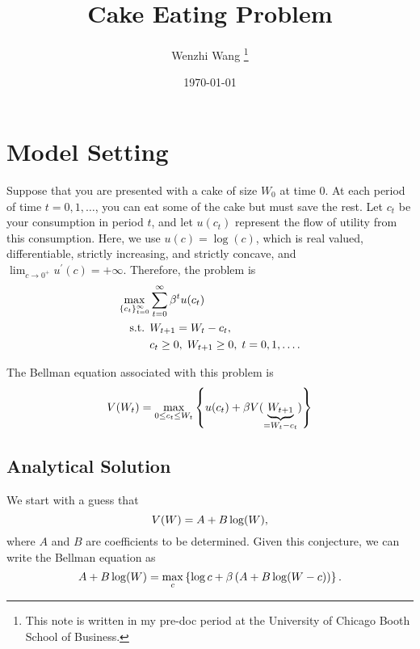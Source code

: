 \documentclass[12pt]{article}
\theoremstyle{definition}
\begin{document}

\title{\bf Cake Eating Problem}
\author{Wenzhi Wang \thanks{This note is written in my pre-doc period at the University of Chicago Booth School of Business.} } 
\date{\today}
\maketitle

\section{Model Setting}

Suppose that you are presented with a cake of size $W_0$ at time $0$. At each period of time $t = 0, 1, \ldots$, you can eat some of the cake but must save the rest. Let $c_t$ be your consumption in period $t$, and let $u(c_t)$ represent the flow of utility from this consumption. Here, we use $u(c) = \log(c)$, which is real valued, differentiable, strictly increasing, and strictly concave, and $\lim_{c \rightarrow 0^+} u^\prime(c) = +\infty$. Therefore, the problem is 
\begin{equation}
    \notag 
    \begin{aligned}
        \max_{\{c_t\}_{t=0}^{\infty}} & \sum_{t=0}^{\infty} \beta^t u(c_t) \\
        \text{ s.t.   } & W_{t+1} = W_t - c_t, \\
        & c_{t}\geq 0,\; W_{t+1} \geq 0, \; t = 0, 1, \ldots. 
    \end{aligned}
\end{equation}

The Bellman equation associated with this problem is 
\begin{equation}
    \notag 
    V(W_t) = \max_{0 \leq c_t \leq W_t} \left\{u(c_t) + \beta V(\underbrace{W_{t+1}}_{=W_t - c_t} )\right\}
\end{equation}


\subsection{Analytical Solution}
We start with a guess that 
\begin{equation}
    \notag 
    V(W) = A + B \log(W),
\end{equation}
where $A$ and $B$ are coefficients to be determined. Given this conjecture, we can write the Bellman equation as 
\begin{equation}
    \notag
    A+B \log (W)=\max _c\left\{\log c+\beta \left(A+B \log (W-c) \right)\right\}.
\end{equation}
\end{document}
